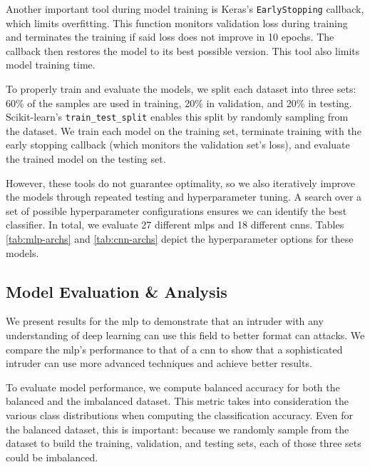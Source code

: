 \documentclass[../main.tex]{subfiles}
\begin{document}

Another important tool during model training is Keras's \texttt{EarlyStopping} callback, which limits overfitting. This function monitors validation loss during training and terminates the training if said loss does not improve in 10 epochs. The callback then restores the model to its best possible version. This tool also limits model training time.


To properly train and evaluate the models, we split each dataset into three sets: 60\% of the samples are used in training, 20\% in validation, and 20\% in testing. Scikit-learn's \texttt{train\_test\_split} enables this split by randomly sampling from the dataset. We train each model on the training set, terminate training with the early stopping callback (which monitors the validation set's loss), and evaluate the trained model on the testing set.


However, these tools do not guarantee optimality, so we also iteratively improve the models through repeated testing and hyperparameter tuning. A search over a set of possible hyperparameter configurations ensures we can identify the best classifier. In total, we evaluate 27 different \acp{mlp} and 18 different \acp{cnn}. Tables \ref{tab:mlp-archs} and \ref{tab:cnn-archs} depict the hyperparameter options for these models.

\subsection{Model Evaluation \& Analysis}


We present results for the \acl{mlp} to demonstrate that an intruder with any understanding of deep learning can use this field to better format \ac{can} attacks. We compare the \ac{mlp}'s performance to that of a \ac{cnn} to show that a sophisticated intruder can use more advanced techniques and achieve better results.


To evaluate model performance, we compute balanced accuracy for both the balanced and the imbalanced dataset. This metric takes into consideration the various class distributions when computing the classification accuracy. Even for the balanced dataset, this is important: because we randomly sample from the dataset to build the training, validation, and testing sets, each of those three sets could be imbalanced. 
\end{document}
